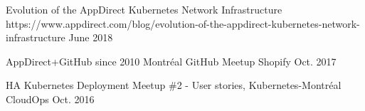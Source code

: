 

\begin{cvhonors}

  \cvhonor
    {Evolution of the AppDirect Kubernetes Network Infrastructure} %
    {https://www.appdirect.com/blog/evolution-of-the-appdirect-kubernetes-network-infrastructure} %
    {} %
    {June 2018} %

\end{cvhonors}


\begin{cvhonors}

  \cvhonor
    {AppDirect+GitHub since 2010} %
    {Montréal GitHub Meetup} %
    {Shopify} %
    {Oct. 2017} %

  \cvhonor
    {HA Kubernetes Deployment} %
    {Meetup \#2 - User stories, Kubernetes-Montréal} %
    {CloudOps} %
    {Oct. 2016} %

\end{cvhonors}